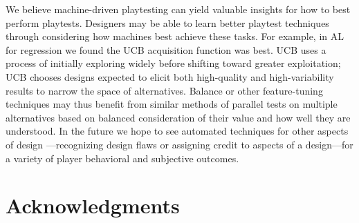 \documentclass{sig-alternate}
\begin{document}
We believe machine-driven playtesting can yield valuable insights for how to best perform playtests.
Designers may be able to learn better playtest techniques through considering how machines best achieve these tasks.
For example, in AL for regression we found the UCB acquisition function was best.
UCB uses a process of initially exploring widely before shifting toward greater exploitation; UCB chooses designs expected to elicit both high-quality and high-variability results to narrow the space of alternatives.
Balance or other feature-tuning techniques may thus benefit from similar methods of parallel tests on multiple alternatives based on balanced consideration of their value and how well they are understood.
In the future we hope to see automated techniques for other aspects of design ---recognizing design flaws or assigning credit to aspects of a design---for a variety of player behavioral and subjective outcomes.




\section{Acknowledgments}



\end{document}
